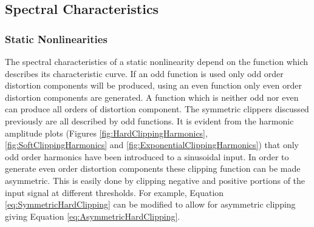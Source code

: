 %			
%
%			

	\subsection{Spectral Characteristics}
	\label{sec:ExcitationEvaluation-Comparison-SpectralCharacteristics}
		\subsubsection*{Static Nonlinearities}
			The spectral characteristics of a static nonlinearity depend on the function which describes its
			characteristic curve. If an odd function is used only odd order distortion components will be
			produced, using an even function only even order distortion components are generated. A function
			which is neither odd nor even can produce all orders of distortion component. The symmetric
			clippers discussed previously are all described by odd functions. It is evident from the harmonic
			amplitude plots (Figures \ref{fig:HardClippingHarmonics}, \ref{fig:SoftClippingHarmonics} and
			\ref{fig:ExponentialClippingHarmonics}) that only odd order harmonics have been introduced to a
			sinusoidal input. In order to generate even order distortion components these clipping function can
			be made asymmetric. This is easily done by clipping negative and positive portions of the input
			signal at different thresholds. For example, Equation \ref{eq:SymmetricHardClipping} can be
			modified to allow for asymmetric clipping giving Equation \ref{eq:AsymmetricHardClipping}.
			
